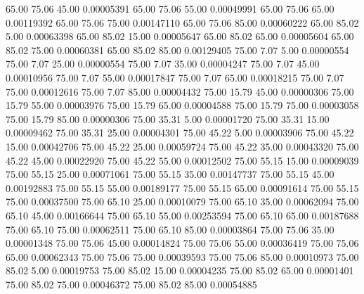      65.00     75.06     45.00     0.00005391
     65.00     75.06     55.00     0.00049991
     65.00     75.06     65.00     0.00119392
     65.00     75.06     75.00     0.00147110
     65.00     75.06     85.00     0.00060222
     65.00     85.02      5.00     0.00063398
     65.00     85.02     15.00     0.00005647
     65.00     85.02     65.00     0.00005604
     65.00     85.02     75.00     0.00060381
     65.00     85.02     85.00     0.00129405
     75.00      7.07      5.00     0.00000554
     75.00      7.07     25.00     0.00000554
     75.00      7.07     35.00     0.00004247
     75.00      7.07     45.00     0.00010956
     75.00      7.07     55.00     0.00017847
     75.00      7.07     65.00     0.00018215
     75.00      7.07     75.00     0.00012616
     75.00      7.07     85.00     0.00004432
     75.00     15.79     45.00     0.00000306
     75.00     15.79     55.00     0.00003976
     75.00     15.79     65.00     0.00004588
     75.00     15.79     75.00     0.00003058
     75.00     15.79     85.00     0.00000306
     75.00     35.31      5.00     0.00001720
     75.00     35.31     15.00     0.00009462
     75.00     35.31     25.00     0.00004301
     75.00     45.22      5.00     0.00003906
     75.00     45.22     15.00     0.00042706
     75.00     45.22     25.00     0.00059724
     75.00     45.22     35.00     0.00043320
     75.00     45.22     45.00     0.00022920
     75.00     45.22     55.00     0.00012502
     75.00     55.15     15.00     0.00009039
     75.00     55.15     25.00     0.00071061
     75.00     55.15     35.00     0.00147737
     75.00     55.15     45.00     0.00192883
     75.00     55.15     55.00     0.00189177
     75.00     55.15     65.00     0.00091614
     75.00     55.15     75.00     0.00037500
     75.00     65.10     25.00     0.00010079
     75.00     65.10     35.00     0.00062094
     75.00     65.10     45.00     0.00166644
     75.00     65.10     55.00     0.00253594
     75.00     65.10     65.00     0.00187688
     75.00     65.10     75.00     0.00062511
     75.00     65.10     85.00     0.00003864
     75.00     75.06     35.00     0.00001348
     75.00     75.06     45.00     0.00014824
     75.00     75.06     55.00     0.00036419
     75.00     75.06     65.00     0.00062343
     75.00     75.06     75.00     0.00039593
     75.00     75.06     85.00     0.00010973
     75.00     85.02      5.00     0.00019753
     75.00     85.02     15.00     0.00004235
     75.00     85.02     65.00     0.00001401
     75.00     85.02     75.00     0.00046372
     75.00     85.02     85.00     0.00054885

